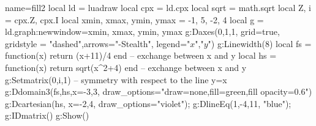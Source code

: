 \documentclass[border=2 mm]{standalone}
\begin{document}
\begin{luadraw}{name=fill2}
local ld = luadraw
local cpx = ld.cpx
local sqrt = math.sqrt
local Z, i = cpx.Z, cpx.I
local xmin, xmax, ymin, ymax = -1, 5, -2, 4
local g = ld.graph:new{window={xmin, xmax, ymin, ymax}}  
g:Daxes({0,1,1}, {grid=true, gridstyle = "dashed",arrows="-Stealth", legend={"$x$","$y$"}})
g:Linewidth(8)
local fs = function(x) return (x+11)/4  end -- exchange between x and y
local hs = function(x) return sqrt(x^2+4) end -- exchange between x and y
g:Setmatrix({0,i,1}) -- symmetry with respect to the line y=x
g:Ddomain3(fs,hs,{x={-3,3}, draw_options="draw=none,fill=green,fill opacity=0.6"})
g:Dcartesian(hs, {x={-2,4}, draw_options="violet"});
g:DlineEq(1,-4,11, "blue");
g:IDmatrix()
g:Show()
\end{luadraw}
\end{document}

